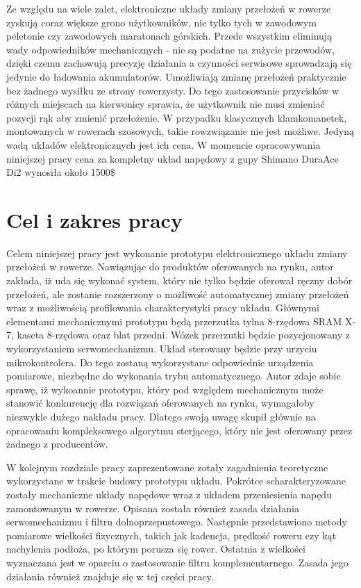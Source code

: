 Ze względu na wiele zalet, elektroniczne układy zmiany przełożeń w rowerze zyskują coraz większe grono użytkowników, nie tylko tych w zawodowym peletonie czy zawodowych maratonach górskich. Przede wszystkim eliminują wady odpowiedników mechanicznych - nie są podatne na zużycie przewodów, dzięki czemu zachowują precyzję działania a czynności serwisowe sprowadzają się jedynie do ładowania akumulatorów. Umożliwiają zmianę przełożeń praktycznie bez żadnego wysiłku ze strony rowerzysty. Do tego zastosowanie przycisków w różnych miejscach na kierwonicy sprawia, że użytkownik nie musi zmieniać pozycji rąk aby zmienić przełożenie. W przypadku klasycznych klamkomanetek, montowanych w rowerach szosowych, takie rowzwiązanie nie jest możliwe. Jedyną wadą układów elektronicznych jest ich cena. W momencie opracowywania niniejszej pracy cena za kompletny układ napędowy z gupy Shimano DuraAce Di2 wynosiła około 1500\$

\section{Cel i zakres pracy}
\label{sec:Cel Pracy}
Celem niniejszej pracy jest wykonanie prototypu elektronicznego układu zmiany przełożeń w rowerze. Nawiązując do produktów oferowanych na rynku, autor zakłada, iż uda się wykonać system, który nie tylko będzie oferował ręczny dobór przełożeń, ale zostanie rozszerzony o możliwość automatycznej zmiany przełożeń wraz z możliwością profilowania charakterystyki pracy układu. Głównymi elementami mechanicznymi prototypu będą przerzutka tylna 8-rzędowa SRAM X-7, kaseta 8-rzędowa oraz blat przedni. Wózek przerzutki będzie pozycjonowany z wykorzystaniem serwomechanizmu. Układ sterowany będzie przy urzyciu mikrokontrolera. Do tego zostaną wykorzystane odpowiednie urządzenia pomiarowe, niezbędne do wykonania trybu automatycznego. Autor zdaje sobie sprawę, iż wykoannie prototypu, który pod względem mechanicznym może stanowić konkurencję dla rozwiązań oferowanych na rynku, wymagałoby niezwykle dużego nakładu pracy. Dlatego swoją uwagę skupił głównie na opracowaniu kompleksowego algorytmu sterjącego, który nie jest oferowany przez żadnego z producentów.

W kolejnym rozdziale pracy zaprezentowane zotały zagadnienia teoretyczne wykorzystane w trakcie budowy prototypu układu. Pokrótce scharakteryzowane zostały  mechaniczne układy napędowe wraz z układem przeniesienia napędu zamontowanym w rowerze. Opisana została również zasada działania serwomechanizmu i filtru dolnoprzepustowego. Następnie przedstawiono metody pomiarowe wielkości fizycznych, takich jak kadencja, prędkość roweru czy kąt nachylenia podłoża, po którym porusza się rower. Ostatnia z wielkości wyznaczana jest w oparciu o zastosowanie filtru komplementarnego. Zasada jego działania również znajduje się w tej części pracy.

